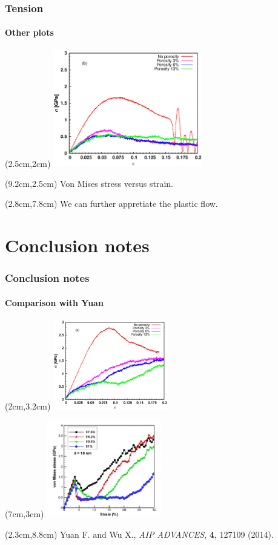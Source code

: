 \documentclass[12pt,t]{beamer}
\begin{document}
\begin{frame}
\frametitle{Tension}
\framesubtitle{Other plots}
  \begin{textblock*}{6.5cm}(2.5cm,2cm) %
  \includegraphics[width=6.5cm]{stress_strain_tens.eps}
  \end{textblock*}
\begin{textblock*}{3cm}(9.2cm,2.5cm) %
  Von Mises stress versus strain.
\end{textblock*}
\begin{textblock*}{9cm}(2.8cm,7.8cm) %
  We can further appretiate the plastic flow.
\end{textblock*}
\end{frame}

\section{Conclusion notes}

\begin{frame}
\frametitle{Conclusion notes}
\framesubtitle{Comparison with Yuan}
  \begin{textblock*}{5cm}(2cm,3.2cm) %
  \includegraphics[width=5cm]{stress_strain_comp_dash.eps}
  \end{textblock*}
\begin{textblock*}{3cm}(7cm,3cm) %
  \includegraphics[width=5cm]{Yuan_VM.png}
\end{textblock*}
\begin{textblock*}{12cm}(2.3cm,8.8cm) %
\tiny{Yuan F. and Wu X., \textit{AIP ADVANCES}, \textbf{4}, 127109 (2014).}
\end{textblock*}
\end{frame}
\end{document}
